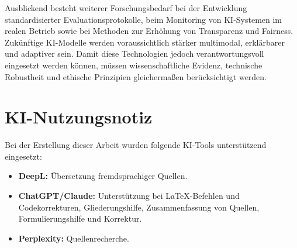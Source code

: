 \documentclass[lettersize,journal]{IEEEtran}
\begin{document}
Ausblickend besteht weiterer Forschungsbedarf bei der Entwicklung standardisierter Evaluationsprotokolle, beim Monitoring von KI-Systemen im realen Betrieb sowie bei Methoden zur Erhöhung von Transparenz und Fairness. Zukünftige KI-Modelle werden voraussichtlich stärker multimodal, erklärbarer und adaptiver sein. Damit diese Technologien jedoch verantwortungsvoll eingesetzt werden können, müssen wissenschaftliche Evidenz, technische Robustheit und ethische Prinzipien gleichermaßen berücksichtigt werden.

\section*{KI-Nutzungsnotiz}
Bei der Erstellung dieser Arbeit wurden folgende KI-Tools unterstützend eingesetzt:

\begin{itemize}
	\item \textbf{DeepL:} Übersetzung fremdsprachiger Quellen.
	\item \textbf{ChatGPT/Claude:} Unterstützung bei LaTeX-Befehlen und Codekorrekturen, Gliederungshilfe, Zusammenfassung von Quellen, Formulierungshilfe und Korrektur.
	\item \textbf{Perplexity:} Quellenrecherche.
\end{itemize}
\end{document}
